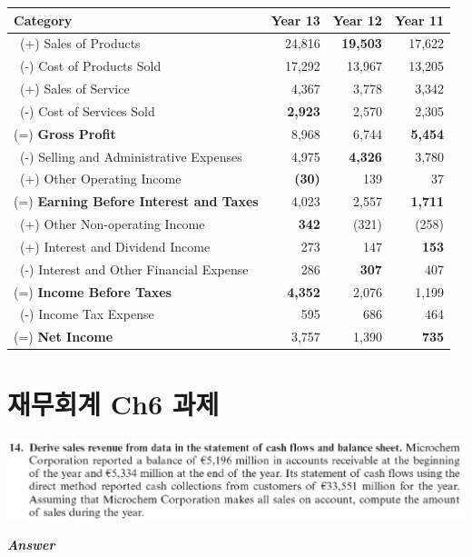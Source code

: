 \documentclass[
  a4paper,
  DIV=11,
  numbers=noendperiod]{scrreprt}
\begin{document}
\begin{longtable}[]{@{}lrrr@{}}
\toprule\noalign{}
Category & Year 13 & Year 12 & Year 11 \\
\midrule\noalign{}
\endhead
\bottomrule\noalign{}
\endlastfoot
~(+) Sales of Products & 24,816 & \textbf{19,503} & 17,622 \\
~(-) Cost of Products Sold & 17,292 & 13,967 & 13,205 \\
~(+) Sales of Service & 4,367 & 3,778 & 3,342 \\
~(-) Cost of Services Sold & \textbf{2,923} & 2,570 & 2,305 \\
(=) \textbf{Gross Profit} & 8,968 & 6,744 & \textbf{5,454} \\
~(-) Selling and Administrative Expenses & 4,975 & \textbf{4,326} &
3,780 \\
~(+) Other Operating Income & \textbf{(30)} & 139 & 37 \\
(=) \textbf{Earning Before Interest and Taxes} & 4,023 & 2,557 &
\textbf{1,711} \\
~(+) Other Non-operating Income & \textbf{342} & (321) & (258) \\
~(+) Interest and Dividend Income & 273 & 147 & \textbf{153} \\
~(-) Interest and Other Financial Expense & 286 & \textbf{307} & 407 \\
(=) \textbf{Income Before Taxes} & \textbf{4,352} & 2,076 & 1,199 \\
~(-) Income Tax Expense & 595 & 686 & 464 \\
(=) \textbf{Net Income} & 3,757 & 1,390 & \textbf{735} \\
\end{longtable}

\chapter*{재무회계 Ch6
과제}\label{uxc7acuxbb34uxd68cuxacc4-ch6-uxacfcuxc81c}


\includegraphics{images/재무회계_6-14.png}

\textbf{\emph{Answer}}
\end{document}
